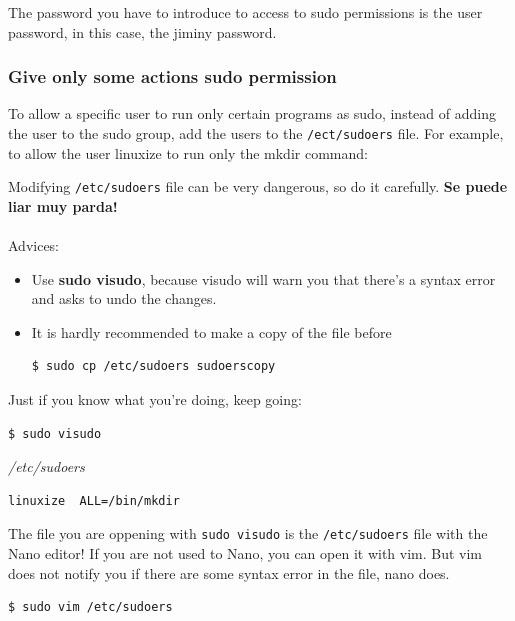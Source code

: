 \documentclass{article}
\newenvironment{blocktemplate}[1]{%
    \tcolorbox[beamer,%
    noparskip,breakable,
    colframe=Blue,%
    colbacklower=LimeGreen!75!LightGreen,%
    title=#1]}%
    {\endtcolorbox}
\newenvironment{blocktemplateII}[1]{%
    \tcolorbox[beamer,%
    noparskip,breakable,
    colframe=Green,%
    colbacklower=LimeGreen!75!LightGreen,%
    title=#1]}%
    {\endtcolorbox}
\newenvironment{blocktemplateIII}[1]{%
    \tcolorbox[beamer,%
    noparskip,breakable,
    ,colframe=Red,%
    colbacklower=LimeGreen!75!LightGreen,%
    title=#1]}%
    {\endtcolorbox}
\newenvironment{codetemplate}[1][]{%
  \mybasecolorbox[#1]
  \itshape
}{%
  \endmybasecolorbox
}
\begin{document}
\begin{blocktemplateII}{NOTE}
The password you have to introduce to access to sudo permissions is the user password, in this case, the jiminy password.
\end{blocktemplateII}


\subsubsection{Give only some actions sudo permission}
To allow a specific user to run only certain programs as sudo, instead of adding the user to the sudo group, add the users to the \verb|/ect/sudoers| file. For example, to allow the user linuxize to run only the mkdir command:

\begin{blocktemplateIII}{WARNING}
Modifying \verb|/etc/sudoers| file can be very dangerous, so do it carefully. \textbf{Se puede liar muy parda!}
\\\\
Advices:
\begin{itemize}
    \item Use \textbf{sudo visudo}, because visudo will warn you that there’s a syntax error and asks to undo the changes.
    \item It is hardly recommended to make a copy of the file before
\begin{codetemplate}{}
\begin{verbatim}
$ sudo cp /etc/sudoers sudoerscopy
\end{verbatim}
\end{codetemplate}
\end{itemize}
\end{blocktemplateIII}
Just if you  know what you're doing, keep going:
\begin{codetemplate}{}
\begin{verbatim}
$ sudo visudo
\end{verbatim}
\end{codetemplate}

\begin{codetemplate}{/etc/sudoers}
\begin{verbatim}
linuxize  ALL=/bin/mkdir
\end{verbatim}
\end{codetemplate}

\begin{blocktemplate}{NOTE}
The file you are oppening with \verb|sudo visudo| is the \verb|/etc/sudoers| file with the Nano editor! If you are not used to Nano, you can open it with vim. But vim does not notify you if there are some syntax error in the file, nano does.
\begin{codetemplate}{}
\begin{verbatim}
$ sudo vim /etc/sudoers
\end{verbatim}
\end{codetemplate}
\end{blocktemplate}
\end{document}
